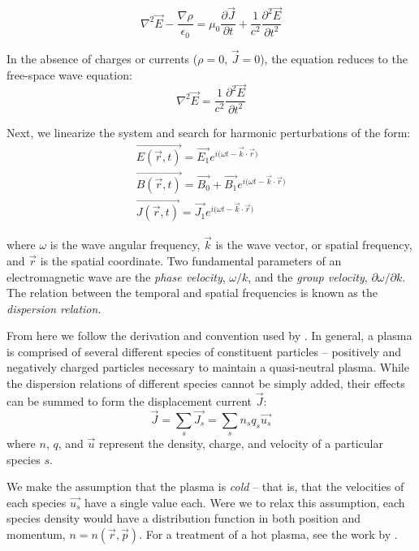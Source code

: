 \begin{equation}
\nabla^2\vec{E} - \frac{\nabla\rho}{\epsilon_0} = \mu_0 \frac{\partial \vec{J}}{\partial t} + \frac{1}{c^2}\frac{\partial^2\vec{E}}{\partial t^2}
\label{eqn:dielectric_tensor_derivation_1}
\end{equation}

In the absence of charges or currents ($\rho=0$, $\vec{J}=0$), the equation reduces to the free-space wave equation:
\begin{equation}
\nabla^2\vec{E} = \frac{1}{c^2}\frac{\partial^2\vec{E}}{\partial t^2}
\end{equation}

Next, we linearize the system and search for harmonic perturbations of the form:
\begin{eqnarray}
\vec{E(\vec{r},t)} = \vec{E_1}e^{{i (\omega t - \vec{k}\cdot \vec{r}})} \label{eqn:linear1}\\ 
\vec{B(\vec{r},t)} = \vec{B_0} + \vec{B_1}e^{{i (\omega t - \vec{k}\cdot \vec{r}})} \label{eqn:linear2}\\
\vec{J(\vec{r},t)} = \vec{J_1}e^{{i (\omega t - \vec{k}\cdot \vec{r}})}\label{eqn:linear3} 
\end{eqnarray}

where $\omega$ is the wave angular frequency, $\vec{k}$ is the wave vector, or spatial frequency, and $\vec{r}$ is the spatial coordinate. Two fundamental parameters of an electromagnetic wave are the \emph{phase velocity}, $\omega/k$, and the \emph{group velocity}, $\partial\omega/\partial k$. The relation between the temporal and spatial frequencies is known as the \emph{dispersion relation}.

From here we follow the derivation and convention used by \cite{Stix1992}. In general, a plasma is comprised of several different species of constituent particles -- positively and negatively charged particles necessary to maintain a quasi-neutral plasma. While the dispersion relations of different species cannot be simply added, their effects can be summed to form the displacement current $\vec{J}$:
\begin{equation}
\vec{J} = \sum_s\vec{J_s} = \sum_s n_s q_s \vec{u_s}
\label{eqn:J}
\end{equation}
where $n$, $q$, and $\vec{u}$ represent the density, charge, and velocity of a particular species $s$. 

We make the assumption that the plasma is \emph{cold} -- that is, that the velocities of each species $\vec{u_s}$ have a single value each. Were we to relax this assumption, each species density would have a distribution function in both position and momentum, $n=n(\vec{r},\vec{p})$. For a treatment of a hot plasma, see the work by \cite{Sazhin1993}.

